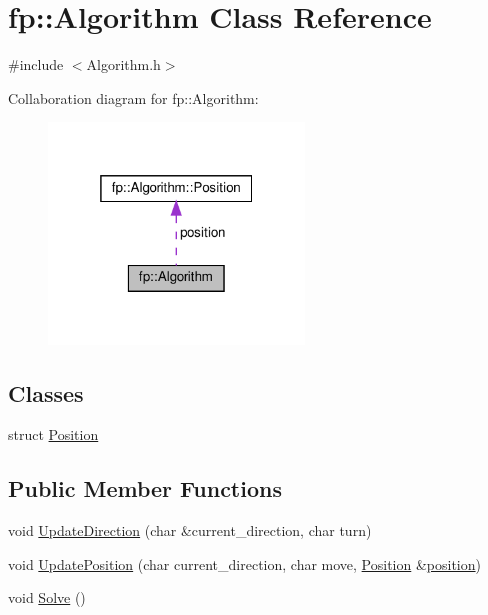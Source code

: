 \hypertarget{classfp_1_1_algorithm}{}\section{fp\+:\+:Algorithm Class Reference}
\label{classfp_1_1_algorithm}


{\ttfamily \#include $<$Algorithm.\+h$>$}



Collaboration diagram for fp\+:\+:Algorithm\+:\nopagebreak
\begin{figure}[H]
\begin{center}
\leavevmode
\includegraphics[width=193pt]{classfp_1_1_algorithm__coll__graph}
\end{center}
\end{figure}
\subsection*{Classes}
\begin{DoxyCompactItemize}
\item 
struct \hyperlink{structfp_1_1_algorithm_1_1_position}{Position}
\end{DoxyCompactItemize}
\subsection*{Public Member Functions}
\begin{DoxyCompactItemize}
\item 
void \hyperlink{classfp_1_1_algorithm_ab91291b423ce58ba86e317112ca0c5ba}{Update\+Direction} (char \&current\+\_\+direction, char turn)
\item 
void \hyperlink{classfp_1_1_algorithm_ad2d339d7e95c730bb5f44511fa3c1246}{Update\+Position} (char current\+\_\+direction, char move, \hyperlink{structfp_1_1_algorithm_1_1_position}{Position} \&\hyperlink{classfp_1_1_algorithm_a841339b57c3d2739325f3f421ada43b6}{position})
\item 
void \hyperlink{classfp_1_1_algorithm_ac6e4cae1f140d0155f2feaaaf1d287c1}{Solve} ()
\end{DoxyCompactItemize}
